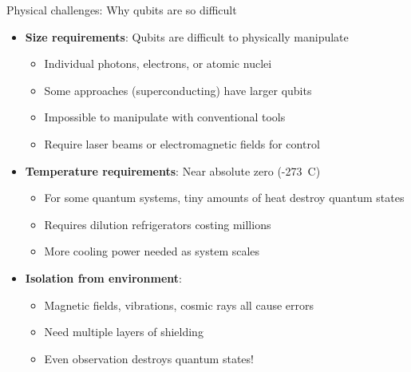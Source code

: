 \documentclass[aspectratio=169, lualatex, handout]{beamer}
\begin{document}
\begin{frame}{Physical challenges: Why qubits are so difficult}
	\begin{itemize}
		\item \textbf{Size requirements}: Qubits are difficult to physically manipulate
		      \begin{itemize}
			      \item Individual photons, electrons, or atomic nuclei
			      \item Some approaches (superconducting) have larger qubits
			      \item Impossible to manipulate with conventional tools
			      \item Require laser beams or electromagnetic fields for control
		      \end{itemize}
		\item \textbf{Temperature requirements}: Near absolute zero (-273\degree\ C)
		      \begin{itemize}
			      \item For some quantum systems, tiny amounts of heat destroy quantum states
			      \item Requires dilution refrigerators costing millions
			      \item More cooling power needed as system scales
		      \end{itemize}
		\item \textbf{Isolation from environment}:
		      \begin{itemize}
			      \item Magnetic fields, vibrations, cosmic rays all cause errors
			      \item Need multiple layers of shielding
			      \item Even observation destroys quantum states!
		      \end{itemize}
	\end{itemize}
\end{frame}
\end{document}
